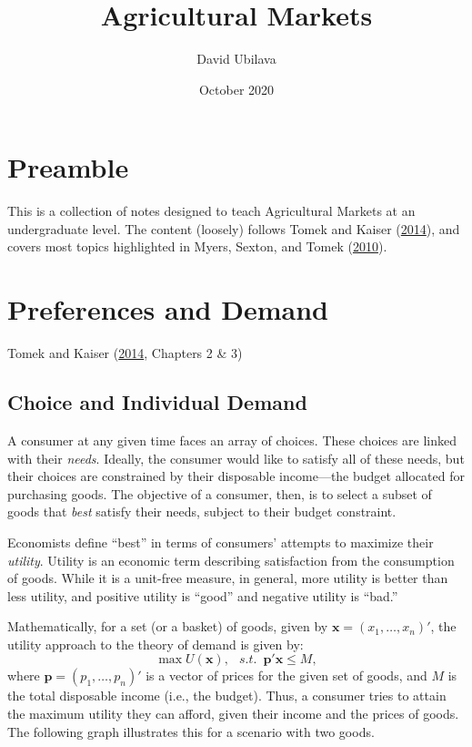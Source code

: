 \documentclass[
]{book}
\title{Agricultural Markets}
\author{David Ubilava}
\date{October 2020}
\begin{document}
\maketitle

{
\setcounter{tocdepth}{1}
\tableofcontents
}
\hypertarget{preamble}{%
\chapter*{Preamble}\label{preamble}}

This is a collection of notes designed to teach Agricultural Markets at an undergraduate level. The content (loosely) follows Tomek and Kaiser (\protect\hyperlink{ref-tomek2014}{2014}), and covers most topics highlighted in Myers, Sexton, and Tomek (\protect\hyperlink{ref-myers2010}{2010}).

\hypertarget{preferences-and-demand}{%
\chapter{Preferences and Demand}\label{preferences-and-demand}}

Tomek and Kaiser (\protect\hyperlink{ref-tomek2014}{2014}, Chapters 2 \& 3)

\hypertarget{choice-and-individual-demand}{%
\section{Choice and Individual Demand}\label{choice-and-individual-demand}}

A consumer at any given time faces an array of choices. These choices are linked with their \emph{needs}. Ideally, the consumer would like to satisfy all of these needs, but their choices are constrained by their disposable income---the budget allocated for purchasing goods. The objective of a consumer, then, is to select a subset of goods that \emph{best} satisfy their needs, subject to their budget constraint.

Economists define ``best'' in terms of consumers' attempts to maximize their \emph{utility}. Utility is an economic term describing satisfaction from the consumption of goods. While it is a unit-free measure, in general, more utility is better than less utility, and positive utility is ``good'' and negative utility is ``bad.''

Mathematically, for a set (or a basket) of goods, given by \(\mathbf{x}=(x_1,\ldots,x_n)'\), the utility approach to the theory of demand is given by: \[\max U(\mathbf{x}),\;~~s.t.\;~\mathbf{p}'\mathbf{x} \leq M,\] where \(\mathbf{p}=(p_1,\ldots,p_n)'\) is a vector of prices for the given set of goods, and \(M\) is the total disposable income (i.e., the budget). Thus, a consumer tries to attain the maximum utility they can afford, given their income and the prices of goods. The following graph illustrates this for a scenario with two goods.
\end{document}
